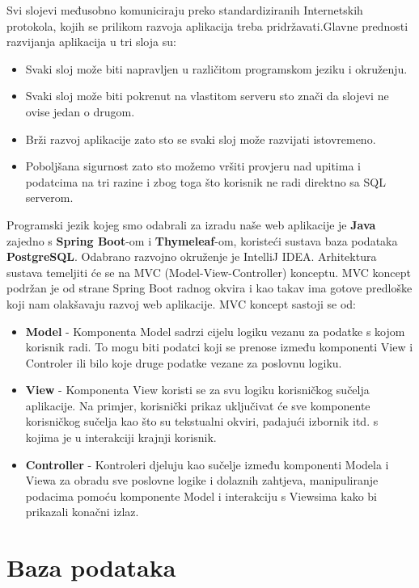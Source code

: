 Svi slojevi međusobno komuniciraju preko standardiziranih Internetskih protokola, kojih se prilikom razvoja 
aplikacija treba pridržavati.Glavne prednosti razvijanja aplikacija u tri sloja su:
\begin{itemize}
	\item Svaki sloj može biti napravljen u različitom programskom jeziku i okruženju.
	\item Svaki sloj može biti pokrenut na vlastitom serveru sto znači da slojevi ne ovise jedan o drugom.
	\item Brži razvoj aplikacije zato sto se svaki sloj može razvijati istovremeno.
	\item Poboljšana sigurnost zato sto možemo vršiti provjeru nad upitima i podatcima na tri razine i zbog toga što korisnik ne radi direktno sa SQL serverom.
\end{itemize}
Programski jezik kojeg smo odabrali za izradu naše web aplikacije je \textbf{Java} zajedno s \textbf{Spring Boot}-om i \textbf{Thymeleaf}-om, koristeći sustava baza podataka \textbf{PostgreSQL}. 
Odabrano razvojno okruženje je IntelliJ IDEA. Arhitektura sustava temeljiti  će se na MVC 
(Model-View-Controller) konceptu. MVC koncept podržan je od strane Spring Boot radnog okvira i kao takav ima gotove predloške koji nam olakšavaju razvoj web aplikacije.
MVC koncept sastoji se od:
\begin{itemize}
	\item \textbf{Model} - Komponenta Model sadrzi cijelu logiku vezanu za podatke s kojom korisnik radi. To mogu biti podatci koji se prenose između komponenti View i Controler ili bilo koje druge podatke vezane za poslovnu logiku.
	\item \textbf{View} - Komponenta View koristi se za svu logiku korisničkog sučelja aplikacije.  Na primjer, korisnički prikaz uključivat će sve komponente korisničkog sučelja kao što su tekstualni okviri, padajući izbornik itd. s kojima je u interakciji krajnji korisnik.
	\item \textbf{Controller} - Kontroleri djeluju kao sučelje između komponenti Modela i Viewa za obradu sve poslovne logike i dolaznih zahtjeva, manipuliranje podacima pomoću komponente Model i interakciju s Viewsima kako bi prikazali konačni izlaz.
\end{itemize} 
\eject


\section{Baza podataka}


